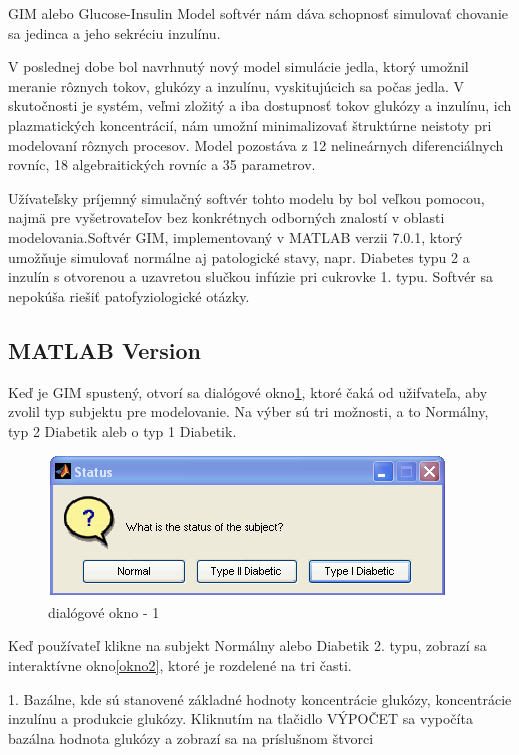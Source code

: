 
GIM alebo Glucose-Insulin Model softvér nám dáva schopnosť simulovať chovanie sa jedinca a jeho sekréciu inzulínu.\cite{2007}

V poslednej dobe bol navrhnutý nový model simulácie jedla, ktorý umožnil meranie rôznych tokov, glukózy a inzulínu, vyskitujúcich sa počas jedla. V skutočnosti je systém, veľmi zložitý a iba dostupnosť tokov glukózy a inzulínu, ich plazmatických koncentrácií, nám umožní minimalizovať štruktúrne neistoty pri modelovaní rôznych procesov. Model pozostáva z 12 nelineárnych diferenciálnych rovníc, 18 algebraitických rovníc a 35 parametrov.\cite{2007}

 Užívateľsky príjemný simulačný softvér tohto modelu by bol veľkou pomocou, najmä pre vyšetrovateľov bez konkrétnych odborných znalostí v oblasti modelovania.Softvér GIM, implementovaný v MATLAB verzii 7.0.1, ktorý umožňuje simulovať normálne aj patologické stavy, napr. Diabetes typu 2 a inzulín s otvorenou a uzavretou slučkou infúzie pri cukrovke 1. typu. Softvér sa nepokúša riešiť patofyziologické otázky.

\subsection{MATLAB Version}

Keď je GIM spustený, otvorí sa dialógové okno\ref{okno1}, ktoré čaká od užifvateľa, aby zvolil typ subjektu pre modelovanie. Na výber sú tri možnosti, a to Normálny, typ 2 Diabetik aleb o typ 1 Diabetik.

\begin{figure}[H]
\centering
\includegraphics[scale=1]{ob-1.PNG}
\caption{dialógové okno - 1 \cite{2007}}
\label{okno1}
\end{figure}

Keď používateľ klikne na subjekt Normálny alebo Diabetik 2. typu, zobrazí sa interaktívne okno\ref{okno2}, ktoré je rozdelené na tri časti. 

1. Bazálne, kde sú stanovené základné hodnoty koncentrácie glukózy, koncentrácie inzulínu a produkcie glukózy. Kliknutím na tlačidlo VÝPOČET sa vypočíta bazálna hodnota glukózy a zobrazí sa na príslušnom štvorci \cite{2007}

